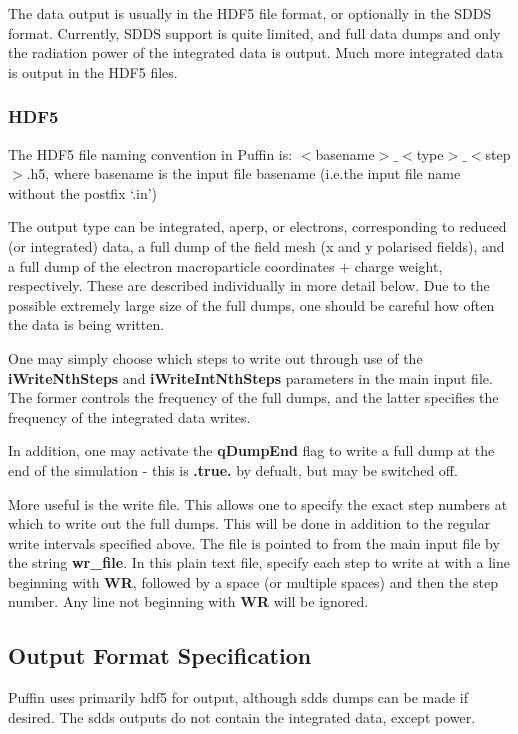 \documentclass[12pt]{article}%
\begin{document}
The data output is usually in the HDF5 file format, or optionally in the SDDS format. Currently, SDDS support is quite limited, and full data dumps and only the radiation power of the integrated data is output. Much more integrated data is output in the HDF5 files.

\subsubsection{HDF5}

The HDF5 file naming convention in Puffin is: $<$basename$>\_<$type$>\_<$step$>$.h5, where basename is the input file basename (i.e.the input file name without the postfix `.in')

The output type can be integrated, aperp, or electrons, corresponding to reduced (or integrated) data, a full dump of the field mesh (x and y polarised fields), and a full dump of the electron macroparticle coordinates $+$ charge weight, respectively. These are described individually in more detail below. Due to the possible extremely large size of the full dumps, one should be careful how often the data is being written.

One may simply choose which steps to write out through use of the {\bf iWriteNthSteps} and {\bf iWriteIntNthSteps} parameters in the main input file. The former controls the frequency of the full dumps, and the latter specifies the frequency of the integrated data writes.

In addition, one may activate the {\bf qDumpEnd} flag to write a full dump at the end of the simulation - this is {\bf .true.} by defualt, but may be switched off.

More useful is the write file. This allows one to specify the exact step numbers at which to write out the full dumps. This will be done in addition to the regular write intervals specified above. The file is pointed to from the main input file by the string {\bf wr\_file}. In this plain text file, specify each step to write at with a line beginning with {\bf WR}, followed by a space (or multiple spaces) and then the step number. Any line not beginning with {\bf WR} will be ignored.

\subsection{Output Format Specification}

Puffin uses primarily hdf5 for output, although sdds dumps can be made if desired. The sdds outputs do not contain the integrated data, except power.
\end{document}
